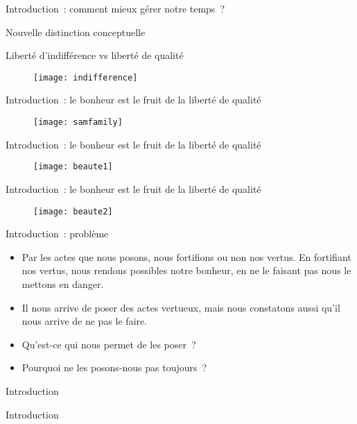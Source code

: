 \documentclass[11pt,xcolor=dvipsname,ignorenonframetext,handout]{beamer}
\begin{document}
\begin{frame}{Introduction~: comment mieux gérer notre temps~?}
\begin{frame}{Nouvelle distinction conceptuelle}
\begin{itemize}
    \end{itemize}
\end{frame}
\begin{frame}{Liberté d'indifférence vs liberté de qualité}
    {
        \begin{figure}
          \centering
          \texttt{[image: indifference]}
        \end{figure}
          }    
\end{frame}
\begin{frame}{Introduction~: le bonheur est le fruit de la liberté de qualité}
    {
        \begin{figure}
          \centering
          \texttt{[image: samfamily]}
        \end{figure}
          }    
\end{frame}
\begin{frame}{Introduction~: le bonheur est le fruit de la liberté de qualité}
    {
        \begin{figure}
          \centering
          \texttt{[image: beaute1]}
        \end{figure}
          }    
\end{frame}
\begin{frame}{Introduction~: le bonheur est le fruit de la liberté de qualité}
    {
        \begin{figure}
          \centering
          \texttt{[image: beaute2]}
        \end{figure}
          }    
\end{frame}
\begin{frame}{Introduction~: problème}
    \begin{itemize}
        \rightskip=0pt\leftskip=0pt
        \item Par les actes que nous posons, nous fortifions ou non nos vertus. En fortifiant nos vertus, nous rendons possibles notre bonheur, en ne le faisant pas nous le mettons en danger.
        \item Il nous arrive de poser des actes vertueux, mais nous constatons aussi qu'il nous arrive de ne pas le faire.
        \item Qu'est-ce qui nous permet de les poser~?
        \item Pourquoi ne les posons-nous pas toujours~?
    \end{itemize}
\end{frame}{Introduction}
\begin{frame}{Introduction}

\end{frame}
\end{frame}
\end{document}
